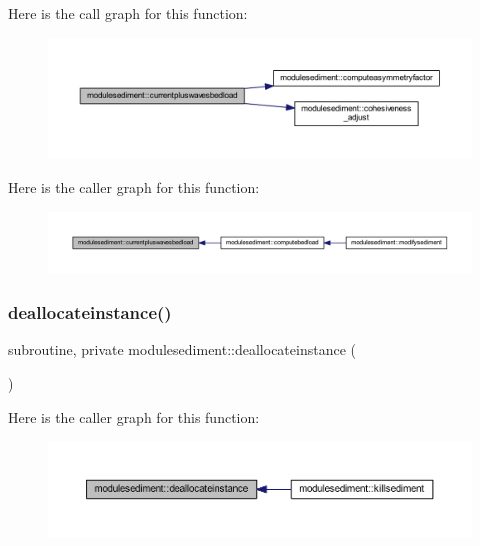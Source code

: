 Here is the call graph for this function\+:\nopagebreak
\begin{figure}[H]
\begin{center}
\leavevmode
\includegraphics[width=350pt]{namespacemodulesediment_ab4e81d1c3c2244f9bb0f378491adbc1e_cgraph}
\end{center}
\end{figure}
Here is the caller graph for this function\+:\nopagebreak
\begin{figure}[H]
\begin{center}
\leavevmode
\includegraphics[width=350pt]{namespacemodulesediment_ab4e81d1c3c2244f9bb0f378491adbc1e_icgraph}
\end{center}
\end{figure}
\mbox{\label{namespacemodulesediment_aaca3b711a9cb64af8d2ec951a1338ddd}} 
\subsubsection{\texorpdfstring{deallocateinstance()}{deallocateinstance()}}
{\footnotesize\ttfamily subroutine, private modulesediment\+::deallocateinstance (\begin{DoxyParamCaption}{ }\end{DoxyParamCaption})\hspace{0.3cm}{\ttfamily [private]}}

Here is the caller graph for this function\+:\nopagebreak
\begin{figure}[H]
\begin{center}
\leavevmode
\includegraphics[width=350pt]{namespacemodulesediment_aaca3b711a9cb64af8d2ec951a1338ddd_icgraph}
\end{center}
\end{figure}
\mbox{\label{namespacemodulesediment_a982ebf7fcffb2f4bd698f8ec31fea0d1}} 
